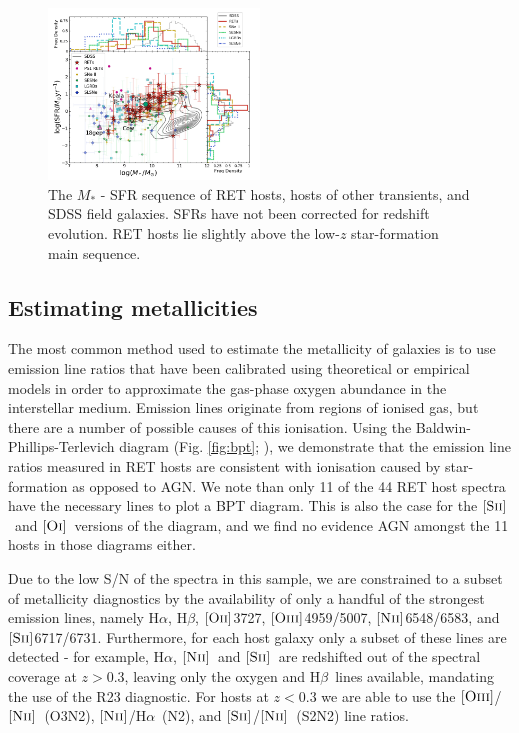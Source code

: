 \documentclass[fleqn,usenatbib,]{mnras}
\newcommand{\phil}[1]{\color{red}#1 \color{black}}
\newcommand{\replylluis}[1]{\color{brown}#1 \color{black}}
\newcommand{\halpha}[0]{H$\alpha$}
\newcommand{\hbeta}[0]{H$\beta$}
\newcommand{\OII}[0]{$[\textnormal{\textsc{Oii}}]$}
\newcommand{\OI}[0]{$[\textnormal{\textsc{Oi}}]$}
\newcommand{\OIII}[0]{$[\textnormal{\textsc{Oiii}}]$}
\newcommand{\SII}[0]{$[\textnormal{\textsc{Sii}}]$}
\newcommand{\NII}[0]{$[\textnormal{\textsc{Nii}}]$}
\begin{document}
\begin{figure}
\includegraphics[width=0.5\textwidth]{figs/SFR_Mike.png}
\caption{The $M_*$ - SFR sequence of RET hosts, \phil{hosts of other transients, and SDSS field galaxies. SFRs have not been corrected for redshift evolution. RET hosts lie slightly above the low-$z$ star-formation main sequence.}
\label{fig:sfms_sfr}}
\end{figure}


\subsection{Estimating metallicities \label{subsec:calc_Z}}

The most common method used to estimate the metallicity of galaxies is to use emission line ratios that have been calibrated using theoretical or empirical models in order to approximate the gas-phase oxygen abundance in the interstellar medium. Emission lines originate from regions of ionised gas, but there are a number of possible causes of this ionisation. Using the Baldwin-Phillips-Terlevich diagram (Fig. \ref{fig:bpt}; \citealt{Baldwin1981}), we demonstrate that the emission line ratios measured in RET hosts are consistent with ionisation caused by star-formation as opposed to AGN. \replylluis{We note than only 11 of the 44 RET host spectra have the necessary lines to plot a BPT diagram. This is also the case for the \SII~and \OI~versions of the diagram, and we find no evidence AGN amongst the 11 hosts in those diagrams either.}

Due to the low S/N of the spectra in this sample, we are constrained to a subset of metallicity diagnostics by the availability of only a handful of the strongest emission lines, namely \halpha, \hbeta, \OII 3727, \OIII 4959/5007, \NII 6548/6583, and \SII 6717/6731. Furthermore, for each host galaxy only a subset of these lines are detected - for example, \halpha, \NII~and \SII~are redshifted out of the spectral coverage at $z>0.3$, leaving only the oxygen and \hbeta~lines available, mandating the use of the R23 diagnostic. For hosts at $z<0.3$ we are able to use the \OIII /\NII~(O3N2), \NII /\halpha~(N2), and \SII /\NII~(S2N2) line ratios. 
\end{document}
